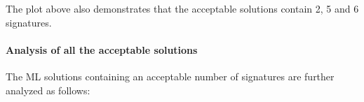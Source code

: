 \documentclass[11pt]{article}
\begin{document}
    \begin{Verbatim}[commandchars=\\\{\}]

    \end{Verbatim}

    The plot above also demonstrates that the acceptable solutions contain
2, 5 and 6 signatures.

\hypertarget{analysis-of-all-the-acceptable-solutions}{%
\paragraph{Analysis of all the acceptable
solutions}\label{analysis-of-all-the-acceptable-solutions}}

The ML solutions containing an acceptable number of signatures are
further analyzed as follows:
\end{document}
